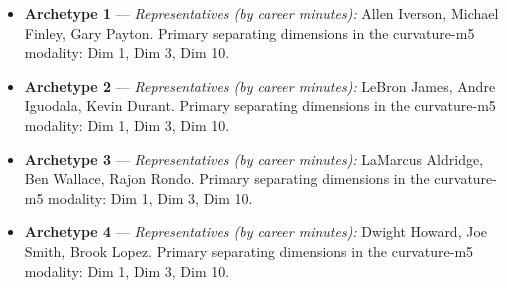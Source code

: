 \begin{itemize}
\item \textbf{Archetype 1} --- \emph{Representatives (by career minutes):} Allen Iverson, Michael Finley, Gary Payton. Primary separating dimensions in the curvature-m5 modality: Dim 1, Dim 3, Dim 10.
\item \textbf{Archetype 2} --- \emph{Representatives (by career minutes):} LeBron James, Andre Iguodala, Kevin Durant. Primary separating dimensions in the curvature-m5 modality: Dim 1, Dim 3, Dim 10.
\item \textbf{Archetype 3} --- \emph{Representatives (by career minutes):} LaMarcus Aldridge, Ben Wallace, Rajon Rondo. Primary separating dimensions in the curvature-m5 modality: Dim 1, Dim 3, Dim 10.
\item \textbf{Archetype 4} --- \emph{Representatives (by career minutes):} Dwight Howard, Joe Smith, Brook Lopez. Primary separating dimensions in the curvature-m5 modality: Dim 1, Dim 3, Dim 10.
\end{itemize}
